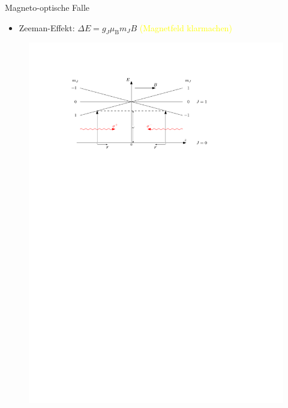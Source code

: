 \documentclass[12pt,xcolor=dvipsnames]{beamer}
\newcommand{\korr}[1]{{\textcolor{Yellow}{(#1)}}}
\begin{document}
\begin{frame}{Magneto-optische Falle}
\begin{itemize}
	\item Zeeman-Effekt: $\Delta E = g_J \mu_\mathrm{B} m_J B$ \korr{Magnetfeld klarmachen}
\end{itemize}

\vspace{0.5cm}

\begin{figure}[h]
	\centering
	\includegraphics[width=1\textwidth]{./figures/mot.pdf}
\end{figure}
\end{frame}
\end{document}
